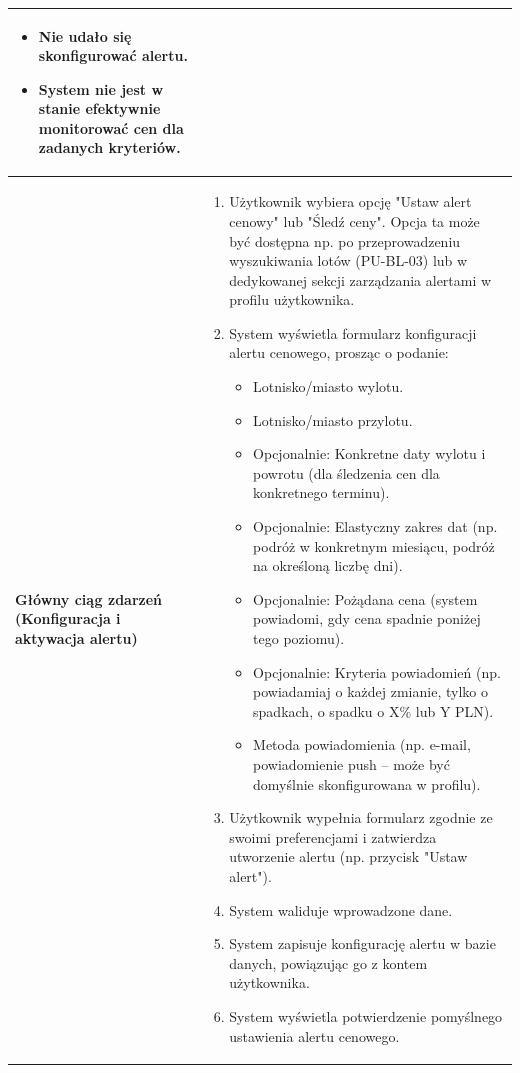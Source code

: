 \documentclass[a4paper,12pt]{article}
\begin{document}
\begin{longtable}{|p{\pierwszakolumnaszerokoscPUBLAlertCen}|p{\drugakolumnaszerokoscPUBLAlertCen}|}
\begin{itemize}
            \item Nie udało się skonfigurować alertu.
            \item System nie jest w stanie efektywnie monitorować cen dla zadanych kryteriów.
        \end{itemize} \\
    \hline
    \textbf{Główny ciąg zdarzeń (Konfiguracja i aktywacja alertu)} &
        \begin{enumerate} \itemsep0pt \parskip0pt \parsep0pt
            \item Użytkownik wybiera opcję "Ustaw alert cenowy" lub "Śledź ceny". Opcja ta może być dostępna np. po przeprowadzeniu wyszukiwania lotów (PU-BL-03) lub w dedykowanej sekcji zarządzania alertami w profilu użytkownika.
            \item System wyświetla formularz konfiguracji alertu cenowego, prosząc o podanie:
                \begin{itemize} \itemsep0pt \parskip0pt \parsep0pt
                    \item Lotnisko/miasto wylotu.
                    \item Lotnisko/miasto przylotu.
                    \item Opcjonalnie: Konkretne daty wylotu i powrotu (dla śledzenia cen dla konkretnego terminu).
                    \item Opcjonalnie: Elastyczny zakres dat (np. podróż w konkretnym miesiącu, podróż na określoną liczbę dni).
                    \item Opcjonalnie: Pożądana cena (system powiadomi, gdy cena spadnie poniżej tego poziomu).
                    \item Opcjonalnie: Kryteria powiadomień (np. powiadamiaj o każdej zmianie, tylko o spadkach, o spadku o X\% lub Y PLN).
                    \item Metoda powiadomienia (np. e-mail, powiadomienie push – może być domyślnie skonfigurowana w profilu).
                \end{itemize}
            \item Użytkownik wypełnia formularz zgodnie ze swoimi preferencjami i zatwierdza utworzenie alertu (np. przycisk "Ustaw alert").
            \item System waliduje wprowadzone dane.
            \item System zapisuje konfigurację alertu w bazie danych, powiązując go z kontem użytkownika.
            \item System wyświetla potwierdzenie pomyślnego ustawienia alertu cenowego.

\end{enumerate}
\end{longtable}
\end{document}
